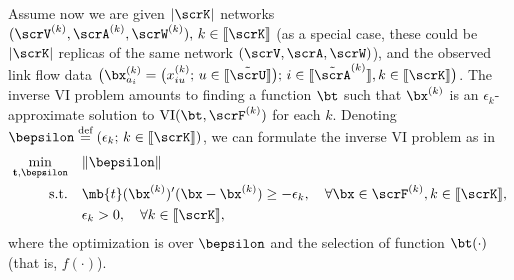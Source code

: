 \documentclass[3p]{elsarticle}
\DeclareMathOperator{\VI}{\text{VI}}
\newcommand*{\defeq}{\stackrel{\text{def}}{=}}
\begin{document}
	
Assume now we are given $|\scrK|$ networks
$(\scrV^{{(k)}},\scrA^{{(k)}},\scrW^{{(k)}}),\, k \in [\kern-0.15em[
\scrK ]\kern-0.15em]$ (as a special case, these could be $|\scrK|$
replicas of the same network $\left( {\scrV, \scrA, \scrW} \right)$),
and the observed link flow data $\big( {\bx_{a_i}^{{(k)}}} = \big(
{x^{{(k)}}_{iu}};\, u \in [\kern-0.15em[ \tilde\scrU
]\kern-0.15em]\big); \, i \in [\kern-0.15em[ \tilde\scrA^{{(k)}}
]\kern-0.15em], k \in [\kern-0.15em[ \scrK ]\kern-0.15em]\big)$. The
inverse VI problem amounts to finding a function $\bt$ such that
$\bx^{{(k)}}$ is an $\epsilon_k$-approximate solution to $\VI(\bt,
\scrF^{{(k)}})$ for each $k$.  Denoting $\bepsilon \defeq (\epsilon_k;
\, k \in [\kern-0.15em[ \scrK ]\kern-0.15em])$, we can formulate the
inverse VI problem as in \cite{bertsimas2014data}
\begin{align}
	\min_{{\mathbf{t}}, \bepsilon} \quad & \| \bepsilon \|
	\label{cdc16-inverseVI1} \\
	\text{s.t.} \quad & {\mb{t}}({\bx^{{(k)}}})'(\bx-{\bx^{{(k)}}})
        \geq -\epsilon_k, \quad \forall \bx\in \scrF^{{(k)}}, k \in
        [\kern-0.15em[ \scrK
	]\kern-0.15em], \notag \\
	& \epsilon_k > 0, \quad \forall k \in [\kern-0.15em[ \scrK
        ]\kern-0.15em], \notag
\end{align}
where the optimization is over $\bepsilon$ and the selection of function
$\bt(\cdot)$ (that is, $f(\cdot)$).
	
\end{document}
